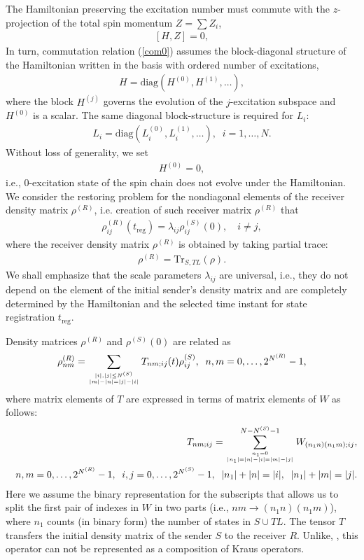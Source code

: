 \documentclass[pra,preprint,showpacs]{revtex4-1}
\begin{document}
The Hamiltonian preserving the excitation number must commute with the $z$-projection of the total spin momentum $Z=\sum Z_i$,
\begin{eqnarray}\label{com0}\label{com}
[H,Z]=0,
\end{eqnarray}
In turn, commutation relation (\ref{com0}) assumes the block-diagonal structure of the Hamiltonian written in the basis with ordered number of excitations,
\begin{eqnarray}\label{bH}
H={\mbox{diag}} (H^{(0)},H^{(1)},\dots ),
\end{eqnarray}
where the  block $H^{(j)}$ governs the evolution of the $j$-excitation subspace and $H^{(0)}$ is a scalar.
The same diagonal block-structure is required for $L_i$:
\begin{eqnarray}\label{bH}
L_i={\mbox{diag}} (L_i^{(0)},L_i^{(1)},\dots ), \;\; i=1,\dots,N.
\end{eqnarray}
Without loss of generality, we set
\begin{eqnarray}\label{bH0}
H^{(0)}=0,
\end{eqnarray}
i.e., 0-excitation state of the spin chain does not evolve under the Hamiltonian.
We consider the restoring problem for the  nondiagonal elements of the receiver density matrix $\rho^{(R)}$,
i.e. creation of such receiver matrix $\rho^{(R)}$ that
\begin{eqnarray}\label{rest}
\rho^{(R)}_{ij}(t_{\mathrm{reg}}) = \lambda_{ij} \rho^{(S)}_{ij}(0), \quad i\neq j,
\end{eqnarray}
where the receiver density matrix $\rho^{(R)}$ is obtained by taking partial trace:
\begin{eqnarray}\label{R}
\rho^{(R)}={\mbox{Tr}}_{S,TL}(\rho).
\end{eqnarray}
We shall emphasize that the scale parameters $\lambda_{ij}$ are universal, i.e., they do not depend on the element of  the initial sender's density matrix and are completely determined by the Hamiltonian and the selected time instant for state registration {$t_{\mathrm{reg}}$}.

Density matrices $\rho^{(R)}$ and $\rho^{(S)}(0)$ are related as
\begin{eqnarray}\label{rhoR}
\rho^{(R)}_{nm} = \sum_{{|i|,|j|\le N^{(S)}}\atop{|m|-|n|=|j|-|i|}} T_{nm;ij}(t) \rho^{(S)}_{ij}, \;\;n,m = 0,\dots,2^{N^{(R)}}-1,
\end{eqnarray}
where matrix elements of $T$ are expressed in terms of matrix elements of $W$ as follows:
\begin{eqnarray}\label{TT}
&&T_{nm;ij}=\sum_{{n_1=0 }\atop{|n_1|=|n|-|i|=|m|-|j|}}^{N-N^{(S)}-1}W_{(n_1n)(n_1m);ij}, \\\nonumber
&&n,m=0,\dots,2^{N^{(R)}}-1,\;\;i,j=0,\dots,2^{N^{(S)}}-1,\;\;|n_1| + |n| = |i|,\;\;
|n_1|+|m|=|j|.
\end{eqnarray}
Here we assume the binary representation for the subscripts that allows us to split the first pair of indexes in $W$ in two parts (i.e., $nm\to  (n_1n)(n_1 m)$), where $n_1$  counts (in binary form) the number of states in $S\cup TL$.
The tensor $T$ transfers the initial  density matrix of the sender $S$  to the receiver $R$. Unlike, \cite{}, this operator can not be represented as  a composition of Kraus operators.
\end{document}
